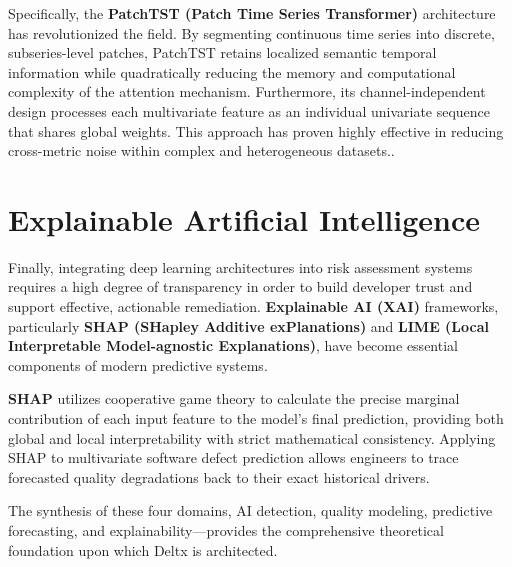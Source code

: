 Specifically, the \textbf{PatchTST (Patch Time Series Transformer)} architecture has revolutionized the field. By segmenting continuous time series into discrete, subseries-level patches, PatchTST retains localized semantic temporal information while quadratically reducing the memory and computational complexity of the attention mechanism\parencite{decompatchtst_hybrid_framework}. Furthermore, its channel-independent design processes each multivariate feature as an individual univariate sequence that shares global weights. This approach has proven highly effective in reducing cross-metric noise within complex and heterogeneous datasets.\parencite{patchtst_nixtla}.

\section{Explainable Artificial Intelligence}

Finally, integrating deep learning architectures into risk assessment systems requires a high degree of transparency in order to build developer trust and support effective, actionable remediation. \textbf{Explainable AI (XAI)} frameworks, particularly \textbf{SHAP (SHapley Additive exPlanations)} and \textbf{LIME (Local Interpretable Model-agnostic Explanations)}, have become essential components of modern predictive systems\parencite{comparing_explainable_ai_models_shap_lime_electric_field}. 

\textbf{SHAP} utilizes cooperative game theory to calculate the precise marginal contribution of each input feature to the model's final prediction, providing both global and local interpretability with strict mathematical consistency\parencite{explainability_testing_ai_shap_lime_testriq}. Applying SHAP to multivariate software defect prediction allows engineers to trace forecasted quality degradations back to their exact historical drivers.

\vspace{0.5cm}

The synthesis of these four domains, AI detection, quality modeling, predictive forecasting, and explainability—provides the comprehensive theoretical foundation upon which Deltx is architected.

